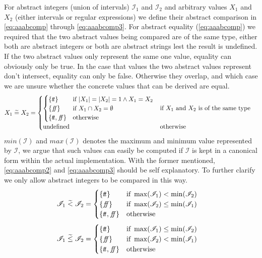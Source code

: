 For abstract integers (union of intervals) $\mathscr{I}_1$ and $\mathscr{I}_2$ and arbitrary values $X_1$ and $X_2$ (either intervals or regular expressions) we define their abstract comparison in \autoref{eq:aaabcomp} through \ref{eq:aaabcomp3}.
For abstract equality (\autoref{eq:aaabcomp}) we required that the two abstract values being compared are of the same type, either both are abstract integers or both are abstract strings lest the result is undefined.
If the two abstract values only represent the same one value, equality can obviously only be true.
In the case that values the two abstract values represent don't intersect, equality can only be false.
Otherwise they overlap, and which case we are unsure whether the concrete values that can be derived are equal.
\begin{align} \label{eq:aaabcomp}
    X_1 \;\aab{=}\; X_2 &= \begin{cases}
        \begin{cases}
        \{\true\} & \text{if } |X_1| = |X_2| = 1 \land X_1 = X_2 \\
        \{\false\} & \text{if } X_1 \cap X_2 = \emptyset \\
        \{\true, \false\} & \text{otherwise }
        \end{cases} & \text{if $X_1$ and $X_2$ is of the same type} \\
        \text{undefined} & \text{otherwise}
    \end{cases}
\end{align}
$min(\mathscr{I})$ and $max(\mathscr{I})$ denotes the maximum and minimum value represented by $\mathscr{I}$, we argue that such values can easily be computed if $\mathscr{I}$ is kept in a canonical form within the actual implementation.
With the former mentioned, \autoref{eq:aaabcomp2} and \ref{eq:aaabcomp3} should be self explanatory.
To further clarify we only allow abstract integers to be compared in this way.
\begin{align}\label{eq:aaabcomp2}
    \mathscr{I}_1 \;\aab{<}\; \mathscr{I}_2 &= \begin{cases}
        \{\true\} & \text{if } \max(\mathscr{I}_1) < \min(\mathscr{I}_2) \\
        \{\false\} & \text{if } \max(\mathscr{I}_2) \leq \min (\mathscr{I}_1) \\
        \{\true, \false\} & \text{otherwise}
    \end{cases}
\end{align}
\begin{align}\label{eq:aaabcomp3}
    \mathscr{I}_1 \;\aab{\leq}\; \mathscr{I}_2 &= \begin{cases}
        \{\true\} & \text{if } \max(\mathscr{I}_1) \leq \min(\mathscr{I}_2) \\
        \{\false\} & \text{if } \max(\mathscr{I}_2) < \min (\mathscr{I}_1) \\
        \{\true, \false\} & \text{otherwise}
    \end{cases}
\end{align}

